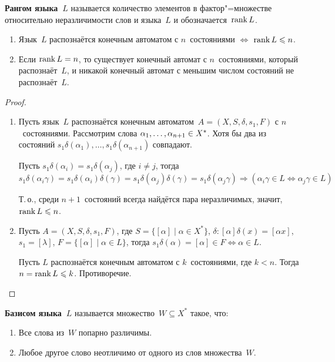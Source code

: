 \textbf{Рангом языка~$L$} называется количество элементов в фактор"=множестве относительно неразличимости слов и языка~$L$ и обозначается~$\operatorname{rank} L$.

\begin{theorem}
\begin{enumerate}
	\item Язык~$L$ распознаётся конечным автоматом с $n$~состояниями $\Leftrightarrow$ $\operatorname{rank} L \leqslant n$.
	\item Если $\operatorname{rank} L = n$, то существует конечный автомат с $n$~состояниями, который распознаёт~$L$, и никакой конечный автомат с меньшим числом состояний не распознаёт~$L$.
\end{enumerate}
\end{theorem}
\begin{proof}
\begin{enumerate}
	\item Пусть язык~$L$ распознаётся конечным автоматом~$A = (X, S, \delta, s_1, F)$ с $n$~состояниями.
	Рассмотрим слова $\alpha_1, \ldots, \alpha_{n+1} \opbr\in X^*$.
	Хотя бы два из состояний $s_1 \delta(\alpha_1), \ldots, s_1 \delta(\alpha_{n+1})$ совпадают.
	
	Пусть $s_1 \delta(\alpha_i) = s_1 \delta(\alpha_j)$, где $i \neq j$, тогда
	\begin{equation*}
	s_1 \delta(\alpha_i \gamma) =
	s_1 \delta(\alpha_i) \delta(\gamma) =
	s_1 \delta(\alpha_j) \delta(\gamma) =
	s_1 \delta(\alpha_j \gamma) \Rightarrow
	(\alpha_i \gamma \in L \Leftrightarrow \alpha_j \gamma \in L)
	\end{equation*}
	
	Т.\,о., среди $n + 1$~состояний всегда найдётся пара неразличимых, значит, $\operatorname{rank} L \leqslant n$.
	
	\item Пусть $A = (X, S, \delta, s_1, F)$, где $S = \{ [\alpha] \mid \alpha \in X^* \}$, $\delta \colon [\alpha] \delta(x) = [\alpha x]$, $s_1 = [\lambda]$, $F = \{ [\alpha] \mid \alpha \in L \}$,
	тогда $s_1 \delta(\alpha) = [\alpha] \in F \Leftrightarrow \alpha \in L$.
	
	Пусть $L$ распознаётся конечным автоматом с $k$~состояниями, где $k < n$.
	Тогда $n = \operatorname{rank} L \leqslant k$.
	Противоречие.
\end{enumerate}
\end{proof}

\textbf{Базисом языка~$L$} называется множество~$W \subseteq X^*$ такое, что:
\begin{enumerate}
	\item Все слова из~$W$ попарно различимы.
	\item Любое другое слово неотличимо от одного из слов множества~$W$.
\end{enumerate}

